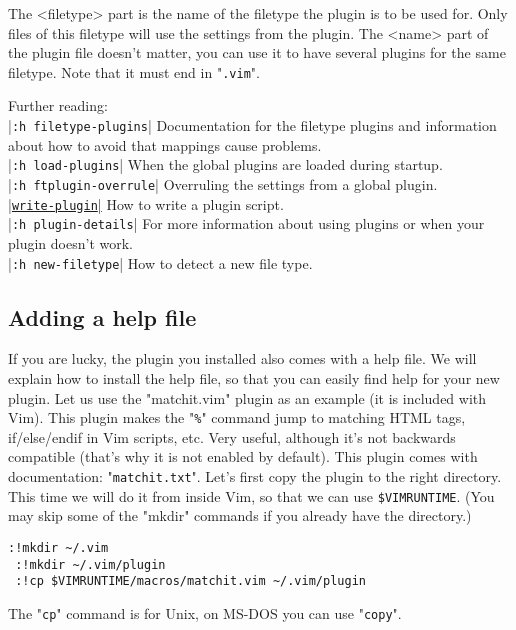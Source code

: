 The <filetype> part is the name of the filetype the plugin is to be used for.
Only files of this filetype will use the settings from the plugin.
The <name> part of the plugin file doesn't matter, you can use it to have several plugins for the same filetype.
Note that it must end in "\texttt{.vim}".

Further reading:\\ %
|\texttt{:h filetype-plugins}| Documentation for the filetype plugins and information about how to avoid that mappings cause problems.\\
|\texttt{:h load-plugins}|     When the global plugins are loaded during startup.\\
|\texttt{:h ftplugin-overrule}|   Overruling the settings from a global plugin.\\
\hyperref[write-plugin]{|\texttt{write-plugin}|}       How to write a plugin script.\\
|\texttt{:h plugin-details}| For more information about using plugins or when your plugin doesn't work.\\
|\texttt{:h new-filetype}|     How to detect a new file type.

\subsection{Adding a help file}
\label{add-local-help}
\label{matchit-install}

If you are lucky, the plugin you installed also comes with a help file.
We will explain how to install the help file, so that you can easily find help for your new plugin.
Let us use the "matchit.vim" plugin as an example (it is included with Vim).
This plugin makes the "\texttt{\%}" command jump to matching HTML tags, if/else/endif in Vim scripts, etc.
Very useful, although it's not backwards compatible (that's why it is not enabled by default).
This plugin comes with documentation: "\texttt{matchit.txt}".
Let's first copy the plugin to the right directory.
This time we will do it from inside Vim, so that we can use \texttt{\$VIMRUNTIME}.
(You may skip some of the "mkdir" commands if you already have the directory.)

 \begin{Verbatim}[samepage=true]
 :!mkdir ~/.vim
 :!mkdir ~/.vim/plugin
 :!cp $VIMRUNTIME/macros/matchit.vim ~/.vim/plugin
 \end{Verbatim}

The "\texttt{cp}" command is for Unix, on MS-DOS you can use "\texttt{copy}".

